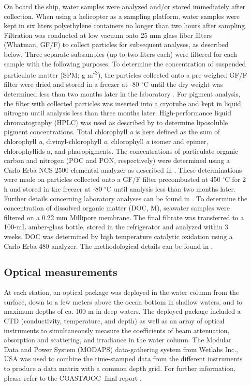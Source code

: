 \documentclass[essd, manuscript]{copernicus}
\newcommand{\coastlooc}{COAST$\mathscr{l}$OOC~\allowbreak}
\begin{document}
On board the ship, water samples were analyzed and/or stored immediately after collection. When using a helicopter as a sampling platform, water samples were kept in six liters polyethylene containers no longer than two hours after sampling. Filtration was conducted at low vacuum onto 25 mm glass fiber filters (Whatman, GF/F) to collect particles for subsequent analyses, as described below. Three separate subsamples (up to two liters each) were filtered for each sample with the following purposes. To determine the concentration of suspended particulate matter (SPM; g m\textsuperscript{-3}), the particles collected onto a pre-weighed GF/F filter were dried and stored in a freezer at -80 $^{\circ}$C until the dry weight was determined less than two months later in the laboratory \citep{VanDerLinde1998}. For pigment analysis, the filter with collected particles was inserted into a cryotube and kept in liquid nitrogen until analysis less than three months later. High-performance liquid chromatography (HPLC) was used as described by \citealt{Vidussi1996} to determine liposoluble pigment concentrations. Total chlorophyll \textit{a} is here defined as the sum of chlorophyll \textit{a}, divinyl-chlorophyll \textit{a}, chlorophyll \textit{a} isomer and epimer, chlorophyllids a, and phaeopigments. The concentrations of particulate organic carbon and nitrogen (POC and PON, respectively) were determined using a Carlo Erba NCS 2500 elemental analyzer as described in \citealt{Ferrari2003}. These determinations were made on particles collected onto a GF/F filter precombusted at 450 $^{\circ}$C for 2 h and stored in the freezer at -80 $^{\circ}$C until analysis less than two months later. Further details concerning laboratory analyses can be found in \citealt{Babin2003b, Ferrari2000, Ferrari2003}. To determine the concentration of dissolved organic matter (DOC, M), seawater samples were filtered on a 0.22 mm Millipore membrane. The final filtrate was transferred to a 100-mL amber-glass bottle, stored in the refrigerator and analyzed within 3 weeks. DOC was determined by high temperature catalytic oxidation using a Carlo Erba 480 analyzer. The methodological details can be found in \citealt{Ferrari2000}.

\subsection{Optical measurements}

At each station, an optical package was deployed in the water column from the surface, down to a few meters above the ocean bottom in shallow waters, and to maximum depths of ca. 100 m in deep waters. The deployed package included a CTD (conductivity, temperature, and depth) as well as an array of optical instruments to simultaneously measure the coefficients of beam attenuation, absorption and scattering, and irradiance in the water column. The Modular Data and Power System (MODAPS) data-gathering system from Wetlabs Inc., USA was used to combine the time-stamped data from the different instruments to produce a data matrix with a common depth grid. For further information, please refer to the \coastlooc final report \citep{Coastlooc2000}.
\end{document}
